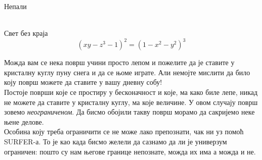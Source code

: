 \documentclass[sr]{./../../common/SurferDesc}%
\begin{document}
\footnotesize

\begin{surferPage}
  \begin{surferTitle}Непали\end{surferTitle}  \\
Свет без краја\\

\smallskip
\[(x y - z^3 -1)^2= (1 - x^2	- y^2)^3\]

\singlespacing
Можда вам се нека површ учини просто лепом и пожелите да је ставите у кристалну куглу пуну снега и да се њоме играте. Али немојте мислити да било коју површ можете да ставите у вашу дневну собу!
\\
\singlespacing
Постоје површи које се простиру у бесконачност и које, ма како биле лепе, никад не можете да ставите у кристалну куглу, ма које величине. У овом случају површ зовемо \textit{неограниченом}. Да бисмо обојили такву површ морамо да сакријемо неке њене делове.
\\
\singlespacing
Особина коју треба ограничити се не може лако препознати, чак ни уз помоћ SURFER-а. То је као када бисмо желели да сазнамо да ли је универзум ограничен: пошто су нам његове границе непознате, можда их има а можда и не.
  \begin{surferText}
     \end{surferText}
\end{surferPage}
\end{document}
